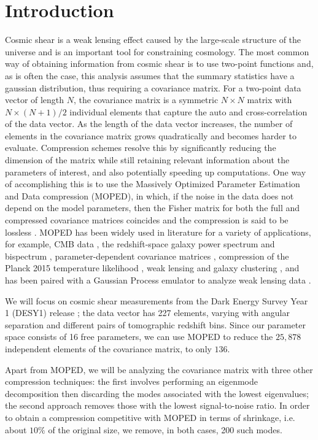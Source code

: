 \documentclass[aps, prd, twocolumn, superscriptaddress, nofootinbib, amssymb, amsmath]{revtex4-2}
\begin{document}
\section{Introduction}
\label{sec:introduction}
Cosmic shear is a weak lensing effect caused by the large-scale structure of the universe and is an important tool for constraining cosmology. The most common way of obtaining information from cosmic shear is to use two-point functions and, as is often the case, this analysis assumes that the summary statistics have a gaussian distribution, thus requiring a covariance matrix. For a two-point data vector of length $N$, the covariance matrix is a symmetric $N\times N$ matrix with $N\times (N+1)/2$ individual elements that capture the auto and cross-correlation of the data vector. As the length of the data vector increases, the number of elements in the covariance matrix grows quadratically and becomes harder to evaluate. Compression schemes resolve this by significantly reducing the dimension of the matrix while still retaining relevant information about the parameters of interest, and also potentially speeding up computations. One way of accomplishing this is to use the Massively Optimized Parameter Estimation and Data compression (MOPED), in which, if the noise in the data does not depend on the model parameters, then the Fisher matrix for both the full and compressed covariance matrices coincides and the compression is said to be lossless \cite{Heavens:2000hjl, Tegmark:1997maa}. MOPED has been widely used in literature for a variety of applications, for example, CMB data \cite{Zablocki:2015zcm}, the redshift-space galaxy power spectrum and bispectrum \cite{Gualdi:2018mjl}, parameter-dependent covariance matrices \cite{Heavens:2017smv}, compression of the Planck 2015 temperature likelihood \cite{Heather:2019d}, weak lensing and galaxy clustering \cite{Ruggeri:2020rb}, and has been paired with a Gaussian Process emulator to analyze weak lensing data \cite{Mootoovaloo:2020}.

We will focus on cosmic shear measurements from the Dark Energy Survey Year 1 (DESY1) release \cite{Troxel:2017xyo,Abbott:2018cms}; the data vector has 227 elements, varying with angular separation and different pairs of tomographic redshift bins. Since our parameter space consists of 16 free parameters, we can use MOPED to reduce the $25,878$ independent elements of the covariance matrix, to only $136$.

Apart from MOPED, we will be analyzing the covariance matrix with three other compression techniques: the first involves performing an eigenmode decomposition then discarding the modes associated with the lowest eigenvalues; the second approach removes those with the lowest signal-to-noise ratio. In order to obtain a compression competitive with MOPED in terms of shrinkage, i.e. about $10\%$ of the original size, we remove, in both cases, 200 such modes.
\end{document}
